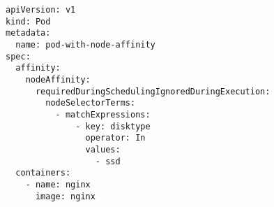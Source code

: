 \begin{verbatim}
apiVersion: v1
kind: Pod
metadata:
  name: pod-with-node-affinity
spec:
  affinity:
    nodeAffinity:
      requiredDuringSchedulingIgnoredDuringExecution:
        nodeSelectorTerms:
          - matchExpressions:
              - key: disktype
                operator: In
                values:
                  - ssd
  containers:
    - name: nginx
      image: nginx
\end{verbatim}